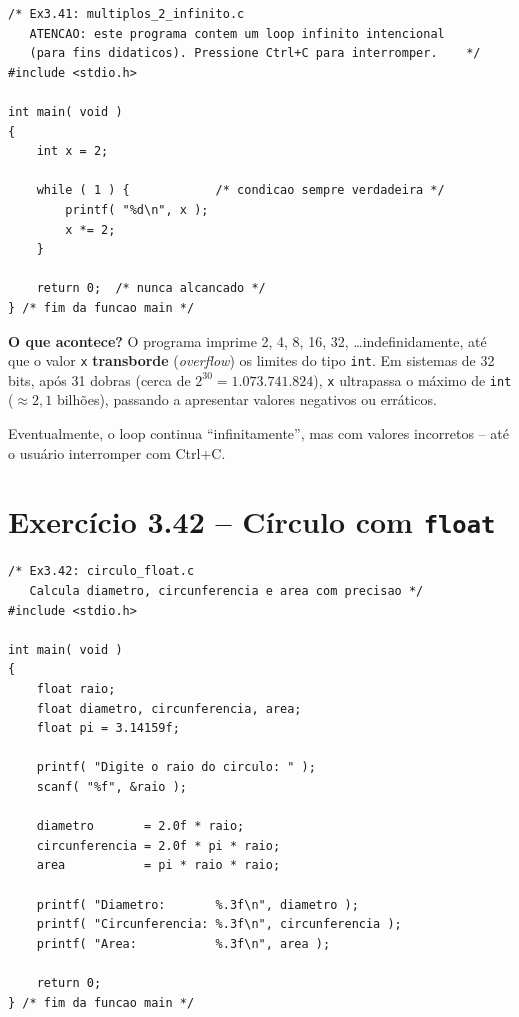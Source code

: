 \documentclass[12pt,a4paper]{article}
\begin{document}
\begin{respostabox}
\begin{lstlisting}
/* Ex3.41: multiplos_2_infinito.c
   ATENCAO: este programa contem um loop infinito intencional
   (para fins didaticos). Pressione Ctrl+C para interromper.    */
#include <stdio.h>

int main( void )
{
    int x = 2;

    while ( 1 ) {            /* condicao sempre verdadeira */
        printf( "%d\n", x );
        x *= 2;
    }

    return 0;  /* nunca alcancado */
} /* fim da funcao main */
\end{lstlisting}

\textbf{O que acontece?} O programa imprime 2, 4, 8, 16, 32, \ldots indefinidamente,
até que o valor \texttt{x} \textbf{transborde} (\textit{overflow}) os limites do
tipo \texttt{int}. Em sistemas de 32 bits, após 31 dobras (cerca de
$2^{30} = 1.073.741.824$), \texttt{x} ultrapassa o máximo de \texttt{int}
(\(\approx 2{,}1\) bilhões), passando a apresentar valores negativos ou erráticos.

Eventualmente, o loop continua ``infinitamente'', mas com valores incorretos -- até
o usuário interromper com Ctrl+C.
\end{respostabox}

\section{Exercício 3.42 -- Círculo com \texttt{float}}

\begin{respostabox}
\begin{lstlisting}
/* Ex3.42: circulo_float.c
   Calcula diametro, circunferencia e area com precisao */
#include <stdio.h>

int main( void )
{
    float raio;
    float diametro, circunferencia, area;
    float pi = 3.14159f;

    printf( "Digite o raio do circulo: " );
    scanf( "%f", &raio );

    diametro       = 2.0f * raio;
    circunferencia = 2.0f * pi * raio;
    area           = pi * raio * raio;

    printf( "Diametro:       %.3f\n", diametro );
    printf( "Circunferencia: %.3f\n", circunferencia );
    printf( "Area:           %.3f\n", area );

    return 0;
} /* fim da funcao main */
\end{lstlisting}
\end{respostabox}
\end{document}
